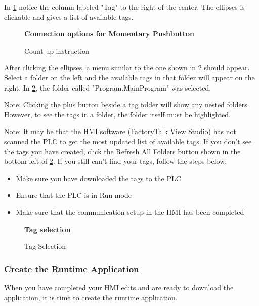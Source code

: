 In \figureautorefname \ref{fig:ConnectionMomentary} notice the column labeled "Tag" to the right of the center. The ellipses is clickable and gives a list of available tags.  

\begin{figure}[h]
\centering
\textbf{Connection options for Momentary Pushbutton}\par \medskip
{}
\caption{Count up instruction}
\label{fig:ConnectionMomentary}
\end{figure}

After clicking the ellipses, a menu similar to the one shown in \figureautorefname \ref{fig:TagSelection} should appear. Select a folder on the left and the available tags in that folder will appear on the right. In \figureautorefname \ref{fig:TagSelection}, the folder called "Program.MainProgram" was selected. 

Note: Clicking the plus button beside a tag folder will show any nested folders. However, to see the tags in a folder, the folder itself must be highlighted.

Note: It may be that the HMI software (FactoryTalk View Studio) has not scanned the PLC to get the most updated list of available tags. If you don't see the tags you have created, click the Refresh All Folders button shown in the bottom left of \figureautorefname \ref{fig:TagSelection}. If you still can't find your tags, follow the steps below:

\begin{samepage}
\begin{itemize}
    \item Make sure you have downloaded the tags to the PLC
    \item Ensure that the PLC is in Run mode
    \item Make sure that the communication setup in the HMI has been completed
\end{itemize}
\end{samepage}

\begin{figure}[h]
\centering
\textbf{Tag selection}\par \medskip
{}
\caption{Tag Selection}
\label{fig:TagSelection}
\end{figure}

\subsubsection{Create the Runtime Application}
When you have completed your HMI edits and are ready to download the application, it is time to create the runtime application. 


